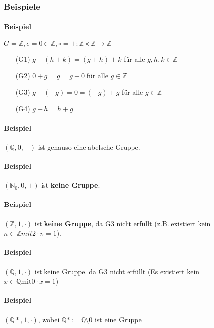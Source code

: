 \documentclass[14pt,a4paper]{article}
\newcommand{\N}{\ensuremath{\mathbb{N}}}
\newcommand{\Z}{\ensuremath{\mathbb{Z}}}
\newcommand{\Nzero}{\ensuremath{\N_0}}
\begin{document}
  \subsubsection{Beispiele}
  \paragraph{Beispiel}
  $ G = \mathbb{Z}, e = 0 \in \mathbb{Z}, \circ=+ : \Z \times \Z \to \Z $

  \begin{enumerate}
    \item[(G1)] $g+(h+k) = (g+h)+k$ für alle $g,h,k \in \Z$\\ \par
    \item[(G2)] $0+g = g = g+0 $ für alle $g \in \Z$ \\ \par
    \item[(G3)] $g + (-g) = 0 = (-g) + g$ für alle $g \in \Z$ \\ \par
    \item[(G4)] $g+h = h+g$
  \end{enumerate}

  \paragraph{Beispiel} $(\mathbb{Q}, 0, +)$ ist genauso eine abelsche Gruppe.
  \paragraph{Beispiel} $(\Nzero, 0, +)$ ist \textbf{keine Gruppe}.
  \paragraph{Beispiel} $(\Z, 1, \cdot)$ ist \textbf{keine Gruppe}, da G3 nicht
  erfüllt (z.B. existiert kein $n \in \Z mit 2 \cdot n = 1$).
  \paragraph{Beispiel} $(\mathbb{Q}, 1, \cdot)$ ist keine Gruppe, da G3 nicht
  erfüllt (Es existiert kein $x \in \mathbb{Q} \text{mit} 0 \cdot x=1$)
  \paragraph{Beispiel} $(\mathbb{Q*}, 1, \cdot)$, wobei $\mathbb{Q}*:=\mathbb{Q}
  \setminus {0}$ ist eine Gruppe
\end{document}
